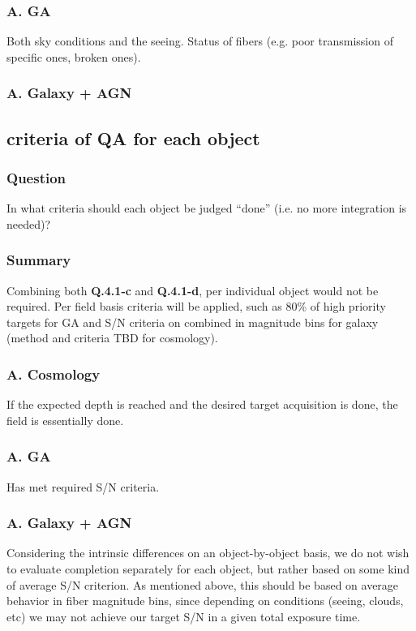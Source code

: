 \documentclass[a4paper,notitlepage]{article}
\begin{document}
\subsubsection{A. GA}
Both sky conditions and the seeing. Status of fibers (e.g. poor
transmission of specific ones, broken ones). 

\subsubsection{A. Galaxy + AGN}


\subsection{criteria of QA for each object}

\subsubsection{Question}
In what criteria should each object be judged ``done''
      (i.e. no more integration is needed)?

\subsubsection{Summary}

Combining both {\bf Q.4.1-c} and {\bf Q.4.1-d}, per individual object would 
not be required. 
Per field basis criteria will be applied, such as 
80\% of high priority targets for GA and S/N criteria on combined in magnitude 
bins for galaxy 
(method and criteria TBD for cosmology). 

\subsubsection{A. Cosmology}
If the expected depth is reached and the desired target acquisition
is done, the field is essentially done.


\subsubsection{A. GA}
Has met required S/N criteria. 

\subsubsection{A. Galaxy + AGN}
Considering the intrinsic differences on an object-by-object basis, we
do not wish to evaluate completion separately for each object, but
rather based on some kind of average S/N criterion.  As mentioned above, this 
should be based on average behavior in fiber magnitude bins, since depending 
on conditions (seeing, clouds, etc) we may not achieve our target 
S/N in a given total exposure time.
\end{document}
